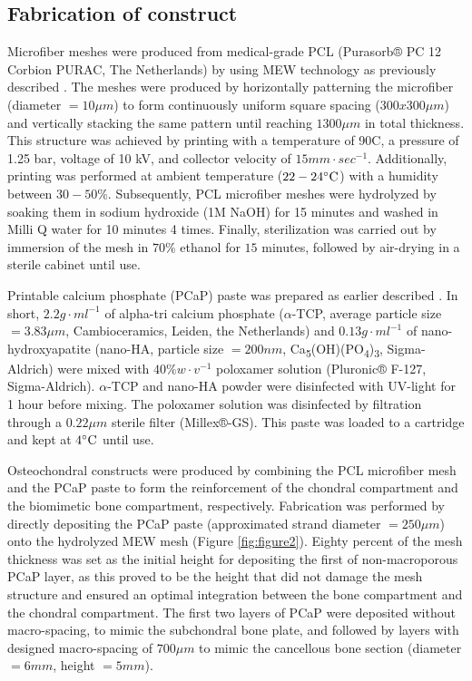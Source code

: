 \documentclass[twocolumn, serif, empirical, authordate, seplic]{jote-article}
\begin{document}
 {}\subsection*{Fabrication of construct} 

Microfiber meshes were produced from medical-grade PCL (Purasorb® PC 12 Corbion PURAC, The Netherlands) by using MEW technology as previously described \parencite{deRuijter2019}. The meshes were produced by horizontally patterning the microfiber (diameter $= 10 \mu m$) to form continuously uniform square spacing ($300x300 \mu m$) and vertically stacking the same pattern until reaching $1300 \mu m$ in total thickness. This structure was achieved by printing with a temperature of 90\degree C, a pressure of 1.25 bar, voltage of 10 kV, and collector velocity of $ 15 mm\cdot sec^{-1} $. Additionally, printing was performed at ambient temperature ($22 - 24 \degree \text{C}$) with a humidity between $30 - 50\%$. Subsequently, PCL microfiber meshes were hydrolyzed by soaking them in sodium hydroxide (1M NaOH) for 15 minutes and washed in Milli Q water for 10 minutes 4 times. Finally, sterilization was carried out by immersion of the mesh in $70\%$ ethanol for $15$ minutes, followed by air-drying in a sterile cabinet until use.

Printable calcium phosphate (PCaP) paste was prepared as earlier described \parencite{Diloksumpan2020}. In short, $2.2 g\cdot ml^{-1}$ of alpha-tri calcium phosphate ($\alpha$-TCP, average particle size $= 3.83 \mu m$, Cambioceramics, Leiden, the Netherlands) and $0.13 g\cdot ml^{-1}$ of nano-hydroxyapatite (nano-HA, particle size $=200 nm$, Ca\textsubscript{5}(OH)(PO\textsubscript{4})\textsubscript{3}, Sigma-Aldrich) were mixed with $40\% w\cdot v^{-1}$ poloxamer solution (Pluronic® F-127, Sigma-Aldrich). $\alpha$-TCP and nano-HA powder were disinfected with UV-light for 1 hour before mixing. The poloxamer solution was disinfected by filtration through a $0.22 \mu m$ sterile filter (Millex®-GS). This paste was loaded to a cartridge and kept at $4\degree \text{C}$ until use.

Osteochondral constructs were produced by combining the PCL microfiber mesh and the PCaP paste to form the reinforcement of the chondral compartment and the biomimetic bone compartment, respectively. Fabrication was performed by directly depositing the PCaP paste (approximated strand diameter $= 250 \mu m$) onto the hydrolyzed MEW mesh (Figure \ref{fig:figure2}). Eighty percent of the mesh thickness was set as the initial height for depositing the first of non-macroporous PCaP layer, as this proved to be the height that did not damage the mesh structure and ensured an optimal integration between the bone compartment and the chondral compartment. The first two layers of PCaP were deposited without macro-spacing, to mimic the subchondral bone plate, and followed by layers with designed macro-spacing of $700 \mu m$ to mimic the cancellous bone section (diameter $= 6 mm$, height $= 5 mm$).
\end{document}
